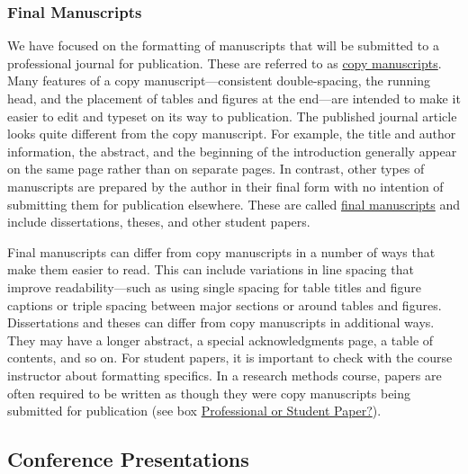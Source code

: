 \documentclass[
]{krantz}
\begin{document}
\subsubsection*{Final Manuscripts}\label{final-manuscripts}


We have focused on the formatting of manuscripts that will be submitted to a professional journal for publication. These are referred to as \hyperref[copy-manuscript]{copy manuscripts}. Many features of a copy manuscript---consistent double-spacing, the running head, and the placement of tables and figures at the end---are intended to make it easier to edit and typeset on its way to publication. The published journal article looks quite different from the copy manuscript. For example, the title and author information, the abstract, and the beginning of the introduction generally appear on the same page rather than on separate pages. In contrast, other types of manuscripts are prepared by the author in their final form with no intention of submitting them for publication elsewhere. These are called \hyperref[final-manuscript]{final manuscripts} and include dissertations, theses, and other student papers.

Final manuscripts can differ from copy manuscripts in a number of ways that make them easier to read. This can include variations in line spacing that improve readability---such as using single spacing for table titles and figure captions or triple spacing between major sections or around tables and figures. Dissertations and theses can differ from copy manuscripts in additional ways. They may have a longer abstract, a special acknowledgments page, a table of contents, and so on. For student papers, it is important to check with the course instructor about formatting specifics. In a research methods course, papers are often required to be written as though they were copy manuscripts being submitted for publication (see box \hyperref[professional-or-student-paper]{Professional or Student Paper?}).

\subsection*{Conference Presentations}\label{conference-presentations}
\end{document}
